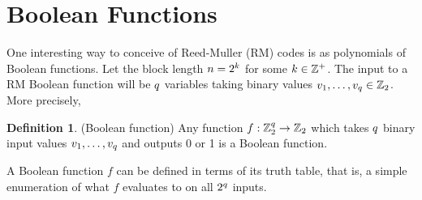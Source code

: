 \documentclass[12pt,twoside]{reedthesis}
\theoremstyle{definition}
\newtheorem{definition}[theorem]{Definition}
\newlength{\arrow}
\newcommand{\Z}{\mathbb{Z}}
\begin{document}
\section{Boolean Functions}
One interesting way to conceive of Reed-Muller (RM) codes is as polynomials of Boolean functions. Let the block length $n = 2^k$ for some $\mlen\in \Z^+$. The input to a RM Boolean function will be $q$ variables taking binary values $\inv{1}, \ldots, \inv{\numin} \in \Z_2$. More precisely,

\begin{definition}(Boolean function) Any function $f: \Z_2^\numin \rightarrow \Z_2$ which takes $q$ binary input values $v_{1}, \ldots, v_{q}$ and outputs 0 or 1 is a Boolean function.
\end{definition}

A Boolean function $f$ can be defined in terms of its truth table, that is, a simple enumeration of what $f$ evaluates to on all $2^q$ inputs.
\end{document}

